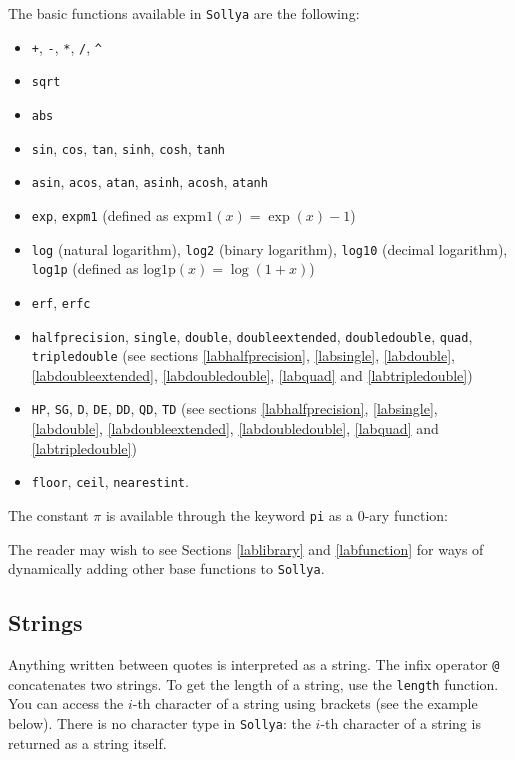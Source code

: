 \documentclass[a4paper]{article}
\newcommand{\com}[1]{\texttt{#1}}
\newcommand{\key}[1]{\texttt{#1}}
\newcommand{\sollya}{\texttt{Sollya}\xspace}
\begin{document}
The basic functions available in \sollya are the following:
\begin{itemize}
\item \com{+}, \com{-}, \com{*}, \com{/}, \com{\^{}}
\item \com{sqrt}
\item \com{abs}
\item \com{sin}, \com{cos}, \com{tan}, \com{sinh}, \com{cosh}, \com{tanh}
\item \com{asin}, \com{acos}, \com{atan}, \com{asinh}, \com{acosh}, \com{atanh}
\item \com{exp}, \com{expm1} (defined as $\mathrm{expm1}(x) = \exp(x)-1$)
\item \com{log} (natural logarithm), \com{log2} (binary logarithm), \com{log10} (decimal logarithm), \com{log1p} (defined as $\mathrm{log1p}(x) = \log(1+x)$)
\item \com{erf}, \com{erfc}
\item \com{halfprecision}, \com{single}, \com{double}, \com{doubleextended}, \com{doubledouble}, \com{quad}, \com{tripledouble} (see sections \ref{labhalfprecision}, \ref{labsingle}, \ref{labdouble}, \ref{labdoubleextended}, \ref{labdoubledouble}, \ref{labquad} and \ref{labtripledouble})
\item \com{HP}, \com{SG}, \com{D}, \com{DE}, \com{DD}, \com{QD}, \com{TD} (see sections \ref{labhalfprecision}, \ref{labsingle}, \ref{labdouble}, \ref{labdoubleextended}, \ref{labdoubledouble}, \ref{labquad} and \ref{labtripledouble})
\item \com{floor}, \com{ceil}, \com{nearestint}.
\end{itemize}

The constant $\pi$ is available through the keyword \key{pi} as a $0$-ary function: 



The reader may wish to see Sections \ref{lablibrary} and \ref{labfunction} for ways of dynamically adding other base functions to \sollya.

\subsection{Strings}
Anything written between quotes is interpreted as a string. The infix operator \com{@} concatenates two strings. To get the length of a string, use the \com{length} function. You can access the $i$-th character of a string using brackets (see the example below). There is no character type in \sollya: the $i$-th character of a string is returned as a string itself.
\end{document}
